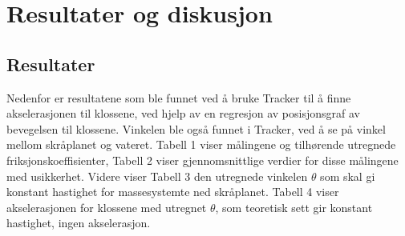 \documentclass[10pt,a4paper]{report}
\begin{document}
{\let\clearpage\relax\chapter*{Resultater og diskusjon}}
\section*{Resultater}
Nedenfor er resultatene som ble funnet ved å bruke Tracker til å finne akselerasjonen til klossene, ved hjelp av en regresjon av posisjonsgraf av bevegelsen til klossene. Vinkelen ble også funnet i Tracker, ved å se på vinkel mellom skråplanet og vateret. Tabell 1 viser målingene og tilhørende utregnede friksjonskoeffisienter, Tabell 2 viser gjennomsnittlige verdier for disse målingene med usikkerhet. Videre viser Tabell 3 den utregnede vinkelen $\theta$ som skal gi konstant hastighet for massesystemte ned skråplanet. Tabell 4 viser akselerasjonen for klossene med utregnet $\theta$, som teoretisk sett gir konstant hastighet, ingen akselerasjon.
\end{document}
